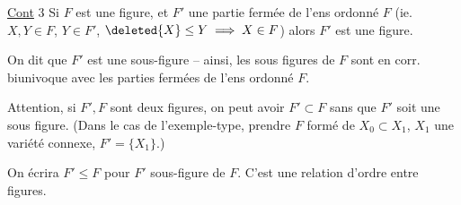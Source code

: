 \uline{Cont} 3 Si $F$ est une  figure, et $F'$ une partie fermée de l'ens ordonné $F$ (ie. $X,Y\in F$, $Y\in F'$, $\deleted{X}\leq Y\implies X\in F$) alors $F'$ est une figure.

On dit que $F'$ est une sous-figure -- ainsi, les sous figures de $F$ sont en corr. biunivoque avec les parties fermées de l'ens ordonné $F$.

Attention, si $F',F$ sont deux figures, on peut avoir $F'\subset F$ sans que $F'$ soit une sous figure. (Dans le cas de l'exemple-type, prendre $F$ formé de $X_0\subset X_1$, $X_1$ une variété connexe, $F'=\{X_1\}$.)


On écrira \deleted{$\unsure{\leq|\subset}$} $F'\leq F$ pour $F'$ sous-figure de $F$. C'est une relation d'ordre entre figures.


